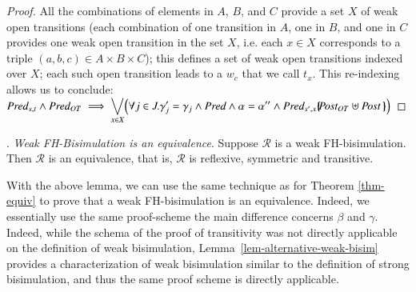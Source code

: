 \documentclass{elsarticle}
\begin{document}
\begin{proof}
All the combinations of elements in $A$, $B$, and $C$ provide a set $X$ of weak open transitions (each combination of one transition in $A$, one in $B$, and one in $C$ provides one weak open transition in the set $X$, i.e. each $x\in X$ corresponds to a triple $(a,b,c)\in A\times B\times C$); this defines a set of weak open transitions indexed over $X$;  each such open transition leads to a $w_c$ that we call $t_x$. This re-indexing allows us to conclude:\\
$\Pred_{s,t} \land \Pred_{OT}\implies
 \displaystyle{\bigvee_{x\in X}} 
\Big(\forall j\in J.\gamma_j'=\gamma_j \land  \Pred \land \alpha=\alpha''  \land \Pred_{s',x}\subst{\Post_{OT}\uplus\Post\,}\Big)$
\end{proof}

\fussy
{}. \emph{Weak FH-Bisimulation is an equivalence}.
 Suppose $\mathcal{R}$ 
is a weak FH-bisimulation. Then $\mathcal{R}$ is an equivalence, that is, $\mathcal{R}$ is 
reflexive, symmetric and transitive.
\sloppy

With the above lemma, we can use the same technique as for Theorem \ref{thm-equiv}  to prove that a weak FH-bisimulation is an equivalence. Indeed, we essentially use the same proof-scheme the main difference concerns  $\beta$ and  $\gamma$. Indeed, while the schema of the proof of transitivity was not directly applicable on the definition of weak bisimulation,  Lemma~\ref{lem-alternative-weak-bisim} provides a characterization of weak bisimulation similar to the definition of strong bisimulation, and thus the same proof scheme is directly applicable.

 

       		



       		
\end{document}

